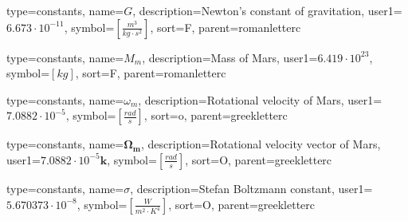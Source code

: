 {
type=constants, %
name={\ensuremath{G}}, %
description={Newton's constant of gravitation}, %
user1={$6.673\cdot10^{-11}$}, %
symbol={$\left[\frac{m^3}{kg \cdot s^{2}}\right]$}, %
sort=F, %
parent=romanletterc %
}

{
type=constants, %
name={\ensuremath{M_{m}}}, %
description={Mass of Mars}, %
user1={$6.419\cdot10^{23}$}, %
symbol={$\left[kg\right]$}, %
sort=F, %
parent=romanletterc %
}

{
type=constants, %
name={\ensuremath{\omega_{m}}}, %
description={Rotational velocity of Mars}, %
user1={$7.0882\cdot10^{-5}$}, %
symbol={$\left[\frac{rad}{s}\right]$}, %
sort=o, %
parent=greekletterc %
}

{
type=constants, %
name={\ensuremath{\mathbf{\Omega_{m}}}}, %
description={Rotational velocity vector of Mars}, %
user1={$7.0882\cdot10^{-5}\mathbf{k}$}, %
symbol={$\left[\frac{rad}{s}\right]$}, %
sort=O, %
parent=greekletterc %
}

{
	type=constants, %
	name={\ensuremath{\sigma}}, %
	description={Stefan Boltzmann constant}, %
	user1={$5.670373\cdot10^{-8}$}, %
	symbol={$\left[\frac{W}{m^2\cdot K^4}\right]$}, %
	sort=O, %
	parent=greekletterc %
}

